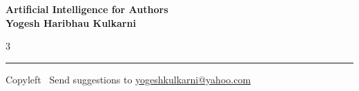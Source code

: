 \documentclass[8pt,landscape]{article}
\begin{document}
\footnotesize


\begin{center}
\Large{\textbf{Artificial Intelligence for Authors\\ Yogesh Haribhau Kulkarni}}
\end{center}

\begin{multicols}{3}

\end{multicols}

\rule{\linewidth}{0.25pt}
\scriptsize
Copyleft \textcopyleft\  Send suggestions to
\href{http://www.yogeshkulkarni.com}{yogeshkulkarni@yahoo.com}
\end{document}
